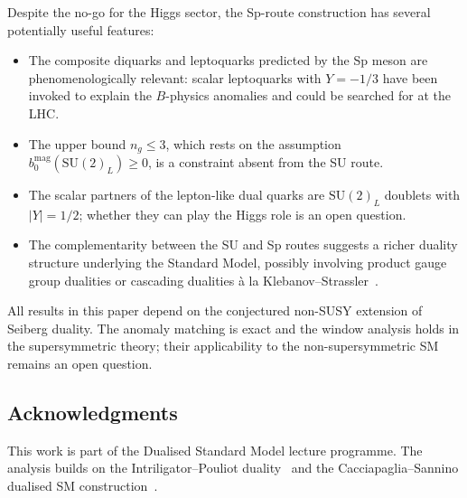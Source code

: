 \documentclass[11pt,a4paper]{article}
\theoremstyle{plain}
\theoremstyle{definition}
\theoremstyle{remark}
\newcommand{\SU}[1]{\mathrm{SU}(#1)}
\begin{document}
Despite the no-go for the Higgs sector, the Sp-route construction has
several potentially useful features:
\begin{itemize}
  \item The composite diquarks and leptoquarks predicted by the Sp
    meson are phenomenologically relevant: scalar leptoquarks with
    $Y = -1/3$ have been invoked to explain the $B$-physics anomalies
    and could be searched for at the LHC.
  \item The upper bound $n_g \leq 3$, which rests on the assumption
    $b_0^{\mathrm{mag}}(\SU{2}_L) \geq 0$, is a constraint absent from
    the SU route.
  \item The scalar partners of the lepton-like dual quarks are
    $\SU{2}_L$ doublets with $|Y| = 1/2$; whether they can play the
    Higgs role is an open question.
  \item The complementarity between the SU and Sp routes suggests a
    richer duality structure underlying the Standard Model, possibly
    involving product gauge group dualities or cascading dualities
    \`a la Klebanov--Strassler~\cite{KlebanovStrassler2000}.
\end{itemize}

All results in this paper depend on the conjectured non-SUSY extension
of Seiberg duality.  The anomaly matching is exact and the window
analysis holds in the supersymmetric theory; their applicability to the
non-supersymmetric SM remains an open question.

\subsection*{Acknowledgments}

This work is part of the Dualised Standard Model lecture programme.
The analysis builds on the Intriligator--Pouliot duality~\cite{IP9505006,IS1995}
and the Cacciapaglia--Sannino dualised SM
construction~\cite{CacciapagliaSannino2024,Sannino2011}.
\end{document}
